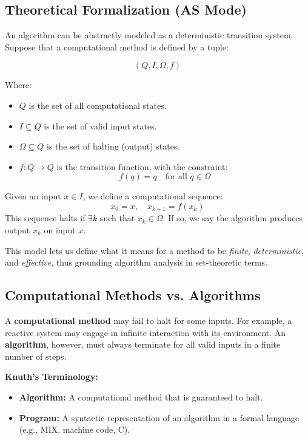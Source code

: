 \documentclass{article}
\begin{document}
\subsection*{Theoretical Formalization (AS Mode)}

An algorithm can be abstractly modeled as a deterministic transition system. Suppose that a computational method is defined by a tuple:

\[
(Q, I, \Omega, f)
\]

Where:
\begin{itemize}
    \item $Q$ is the set of all computational states.
    \item $I \subseteq Q$ is the set of valid input states.
    \item $\Omega \subseteq Q$ is the set of halting (output) states.
    \item $f: Q \to Q$ is the transition function, with the constraint:
    \[
    f(q) = q \quad \text{for all } q \in \Omega
    \]
\end{itemize}

Given an input $x \in I$, we define a computational sequence:
\[
x_0 = x,\quad x_{k+1} = f(x_k)
\]
This sequence halts if $\exists k$ such that $x_k \in \Omega$. If so, we say the algorithm produces output $x_k$ on input $x$.

This model lets us define what it means for a method to be \emph{finite}, \emph{deterministic}, and \emph{effective}, thus grounding algorithm analysis in set-theoretic terms.


\subsection*{Computational Methods vs. Algorithms}

A \textbf{computational method} may fail to halt for some inputs. For example, a reactive system may engage in infinite interaction with its environment. An \textbf{algorithm}, however, must always terminate for all valid inputs in a finite number of steps.

\textbf{Knuth’s Terminology:}
\begin{itemize}
    \item \textbf{Algorithm:} A computational method that is guaranteed to halt.
    \item \textbf{Program:} A syntactic representation of an algorithm in a formal language (e.g., MIX, machine code, C).
\end{itemize}
\end{document}

